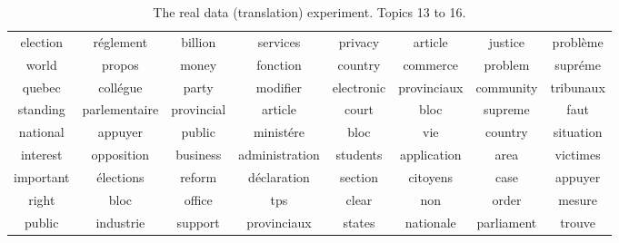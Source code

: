 \documentclass{article}
\begin{document}
\begin{table*}[h!]
\begin{tabular}{cc|cc|cc|cc}
              election &           r\'eglement &               billion &             services &               privacy &              article &               justice &            probl\`eme  \\ 
                 world &               propos &                 money &             fonction &               country &             commerce &               problem &             supr\'eme  \\ 
                quebec &            coll\'egue &                 party &             modifier &            electronic &          provinciaux &             community &            tribunaux  \\ 
              standing &        parlementaire &            provincial &              article &                 court &                 bloc &               supreme &                 faut  \\ 
              national &              appuyer &                public &           minist\'ere &                  bloc &                  vie &               country &            situation  \\ 
              interest &           opposition &              business &       administration &              students &          application &                  area &             victimes  \\ 
             important &           \'elections &                reform &         d\'eclaration &               section &             citoyens &                  case &              appuyer  \\ 
                 right &                 bloc &                office &                  tps &                 clear &                  non &                 order &               mesure  \\ 
                public &            industrie &               support &          provinciaux &                states &            nationale &            parliament &               trouve  \\ 
 \end{tabular}
\caption{The real data (translation) experiment.  Topics 13 to 16. } 
\label{tab:4}
\end{table*}
\setlength{\textfloatsep}{9pt}
\end{document}
